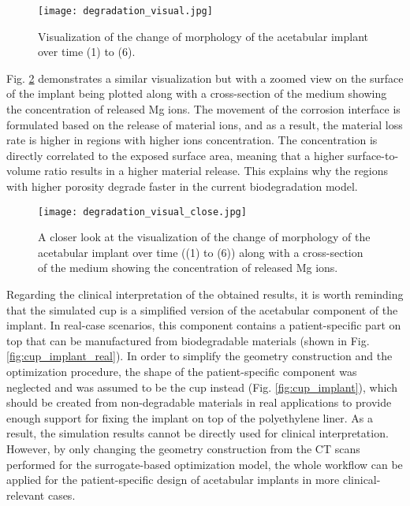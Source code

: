 \begin{figure}[h]
\centering
\medskip
\texttt{[image: degradation\_visual.jpg]}
\caption[Visualization of the change of morphology of the acetabular implant]{Visualization of the change of morphology of the acetabular implant over time (1) to (6).} \label{fig:cup_degradation_visual}
\end{figure}

Fig. \ref{fig:cup_degradation_visual_close} demonstrates a similar visualization but with a zoomed view on the surface of the implant being plotted along with a cross-section of the medium showing the concentration of released Mg ions. The movement of the corrosion interface is formulated based on the release of material ions, and as a result, the material loss rate is higher in regions with higher ions concentration. The concentration is directly correlated to the exposed surface area, meaning that a higher surface-to-volume ratio results in a higher material release. This explains why the regions with higher porosity degrade faster in the current biodegradation model.%

\begin{figure}[h]
\centering
\medskip
\texttt{[image: degradation\_visual\_close.jpg]}
\caption[Visualization of the change of morphology of the acetabular implant]{A closer look at the visualization of the change of morphology of the acetabular implant over time ((1) to (6)) along with a cross-section of the medium showing the concentration of released Mg ions.} \label{fig:cup_degradation_visual_close}
\end{figure}

Regarding the clinical interpretation of the obtained results, it is worth reminding that the simulated cup is a simplified version of the acetabular component of the implant. In real-case scenarios, this component contains a patient-specific part on top that can be manufactured from biodegradable materials (shown in Fig. \ref{fig:cup_implant_real}). In order to simplify the geometry construction and the optimization procedure, the shape of the patient-specific component was neglected and was assumed to be the cup instead (Fig. \ref{fig:cup_implant}), which should be created from non-degradable materials in real applications to provide enough support for fixing the implant on top of the polyethylene liner. As a result, the simulation results cannot be directly used for clinical interpretation. However, by only changing the geometry construction from the CT scans performed for the surrogate-based optimization model, the whole workflow can be applied for the patient-specific design of acetabular implants in more clinical-relevant cases. 

